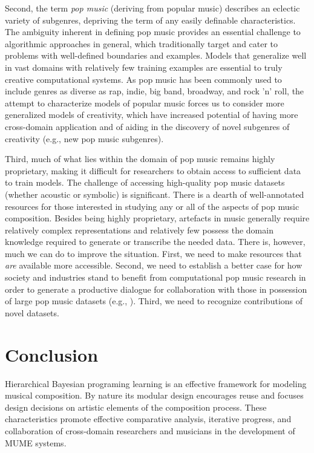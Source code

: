 \documentclass[letterpaper]{article}
\begin{document}
Second, the term \emph{pop music} (deriving from popular music) describes an eclectic variety of subgenres, depriving the term of any easily definable characteristics. The ambiguity inherent in defining pop music provides an essential challenge to algorithmic approaches in general, which traditionally target and cater to problems with well-defined boundaries and examples. Models that generalize well in vast domains with relatively few training examples are essential to truly creative computational systems. As pop music has been commonly used to include genres as diverse as rap, indie, big band, broadway, and rock 'n' roll, the attempt to characterize models of popular music forces us to consider more generalized models of creativity, which have increased potential of having more cross-domain application and of aiding in the discovery of novel subgenres of creativity (e.g., new pop music subgenres).

Third, much of what lies within the domain of pop music remains highly proprietary, making it difficult for researchers to obtain access to sufficient data to train models. The challenge of accessing high-quality pop music datasets (whether acoustic or symbolic) is significant. There is a dearth of well-annotated resources for those interested in studying any or all of the aspects of pop music composition. Besides being highly proprietary, artefacts in music generally require relatively complex representations and relatively few possess the domain knowledge required to generate or transcribe the needed data. There is, however, much we can do to improve the situation. First, we need to make resources that \textit{are} available more accessible. Second, we need to establish a better case for how society and industries stand to benefit from computational pop music research in order to generate a productive dialogue for collaboration with those in possession of large pop music datasets (e.g.,  \cite{bodily2017ICCC}). Third, we need to recognize contributions of novel datasets.

\section{Conclusion}

Hierarchical Bayesian programing learning is an effective framework for modeling musical composition. By nature its modular design encourages reuse and focuses design decisions on artistic elements of the composition process. These characteristics promote effective comparative analysis, iterative progress, and collaboration of cross-domain researchers and musicians in the development of MUME systems.
\end{document}

